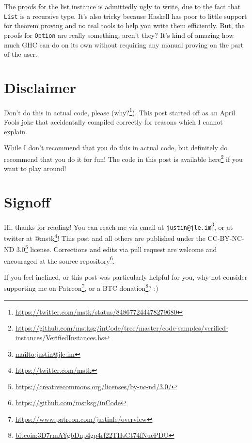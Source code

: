 \documentclass[]{article}
\renewcommand{\href}[2]{#2\footnote{\url{#1}}}
\begin{document}
The proofs for the list instance is admittedly ugly to write, due to the fact
that \texttt{List} is a recursive type. It's also tricky because Haskell has
poor to little support for theorem proving and no real tools to help you write
them efficiently. But, the proofs for \texttt{Option} are really something,
aren't they? It's kind of amazing how much GHC can do on its own without
requiring any manual proving on the part of the user.

\hypertarget{disclaimer}{%
\section{Disclaimer}\label{disclaimer}}

Don't do this in actual code, please
(\href{https://twitter.com/mstk/status/848677244478279680}{why?}). This post
started off as an April Fools joke that accidentally compiled correctly for
reasons which I cannot explain.

While I don't recommend that you do this in actual code, but definitely do
recommend that you do it for fun! The code in this post is available
\href{https://github.com/mstksg/inCode/tree/master/code-samples/verified-instances/VerifiedInstances.hs}{here}
if you want to play around!

\hypertarget{signoff}{%
\section{Signoff}\label{signoff}}

Hi, thanks for reading! You can reach me via email at
\href{mailto:justin@jle.im}{\nolinkurl{justin@jle.im}}, or at twitter at
\href{https://twitter.com/mstk}{@mstk}! This post and all others are published
under the \href{https://creativecommons.org/licenses/by-nc-nd/3.0/}{CC-BY-NC-ND
3.0} license. Corrections and edits via pull request are welcome and encouraged
at \href{https://github.com/mstksg/inCode}{the source repository}.

If you feel inclined, or this post was particularly helpful for you, why not
consider \href{https://www.patreon.com/justinle/overview}{supporting me on
Patreon}, or a \href{bitcoin:3D7rmAYgbDnp4gp4rf22THsGt74fNucPDU}{BTC donation}?
:)
\end{document}
